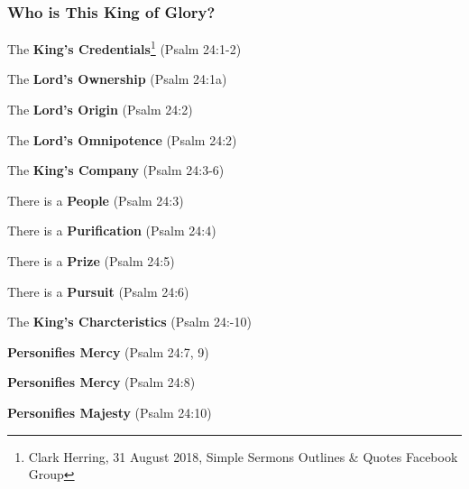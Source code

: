 \subsubsection{Who is This King of Glory?}



\begin{compactenum}[I.]
    \item The \textbf{King's Credentials}\footnote{Clark Herring, 31 August 2018, Simple Sermons Outlines \& Quotes Facebook Group} (Psalm 24:1-2)
    \begin{compactenum}[A.]
    	\item The \textbf{Lord's Ownership} (Psalm 24:1a)
    	\item The \textbf{Lord's Origin} (Psalm 24:2)
    	\item The \textbf{Lord's Omnipotence} (Psalm 24:2)
	\end{compactenum}
    \item The \textbf{King's Company} (Psalm 24:3-6)
    \begin{compactenum}[A.]
    	\item  There is a \textbf{People} (Psalm 24:3)
    	\item  There is a \textbf{Purification} (Psalm 24:4)
    	\item  There is a \textbf{Prize} (Psalm 24:5)
    	\item  There is a \textbf{Pursuit} (Psalm 24:6)
	\end{compactenum}
    \item The \textbf{King's Charcteristics} (Psalm 24:-10)
    \begin{compactenum}[A.]
    	\item  \textbf{Personifies Mercy} (Psalm 24:7, 9)
    	\item  \textbf{Personifies Mercy} (Psalm 24:8)
    	\item  \textbf{Personifies Majesty} (Psalm 24:10)
	\end{compactenum}
\end{compactenum}





